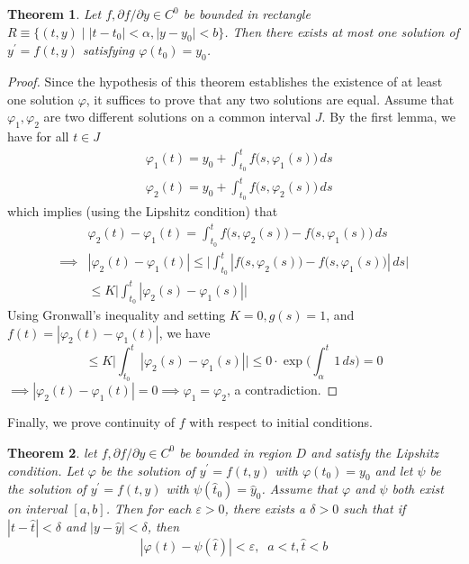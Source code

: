 \documentclass{article}
\newtheorem{theorem}{Theorem}[section]
\theoremstyle{remark}
\theoremstyle{definition}
\begin{document}
    \begin{theorem}
    Let $f, \partial f/ \partial y \in C^0$ be bounded in rectangle $R \equiv \{(t, y) \;|\; |t-t_0| < \alpha, |y - y_0| < b\}$. Then there exists at most one solution of $y^\prime = f(t, y)$ satisfying $\varphi(t_0) = y_0$. 
    \end{theorem}
    \begin{proof}
    Since the hypothesis of this theorem establishes the existence of at least one solution $\varphi$, it suffices to prove that any two solutions are equal. Assume that $\varphi_1, \varphi_2$ are two different solutions on a common interval $J$. By the first lemma, we have for all $t \in J$
    \begin{align*}
        &\varphi_1 (t) = y_0 + \int_{t_0}^t f\big(s, \varphi_1 (s)\big) \,ds \\
        &\varphi_2 (t) = y_0 + \int_{t_0}^t f\big(s, \varphi_2 (s)\big) \,ds
    \end{align*}
    which implies (using the Lipshitz condition) that
    \begin{align*}
        & \varphi_2 (t) - \varphi_1 (t) = \int_{t_0}^t f\big(s, \varphi_2 (s)\big) - f\big(s, \varphi_1 (s)\big) \, ds \\
        \implies & |\varphi_2 (t) - \varphi_1 (t)| \leq \bigg|\int_{t_0}^t |f\big(s, \varphi_2 (s)\big) - f\big(s, \varphi_1 (s)\big)| \, ds\bigg| \\
        & \leq K \bigg| \int_{t_0}^t |\varphi_2 (s) - \varphi_1 (s) | \bigg|
    \end{align*}
    Using Gronwall's inequality and setting $K=0, g(s) = 1$, and $f(t) = |\varphi_2 (t) - \varphi_1 (t)|$, we have
    \[\leq K \bigg| \int_{t_0}^t |\varphi_2 (s) - \varphi_1 (s) | \bigg| \leq 0 \cdot \exp \bigg( \int_{\alpha}^t 1\,ds \bigg) = 0\]
    $\implies |\varphi_2 (t) - \varphi_1 (t)| = 0 \implies \varphi_1 = \varphi_2$, a contradiction. 
    \end{proof}

    Finally, we prove continuity of $f$ with respect to initial conditions. 
    \begin{theorem}
    let $f, \partial f/ \partial y \in C^0$ be bounded in region $D$ and satisfy the Lipshitz condition. Let $\varphi$ be the solution of $y^\prime = f(t, y)$ with $\varphi(t_0) = y_0$ and let $\psi$ be the solution of $y^\prime = f(t, y)$ with $\psi(\hat{t}_0) = \hat{y}_0$. Assume that $\varphi$ and $\psi$ both exist on interval $[a, b]$. Then for each $\varepsilon > 0$, there exists a $\delta > 0$ such that if $|t - \hat{t}| < \delta$ and $|y - \hat{y}| < \delta$, then 
    \[|\varphi(t) - \psi(\hat{t})| < \varepsilon, \;\; a < t, \hat{t} < b\]
    \end{theorem}
\end{document}
